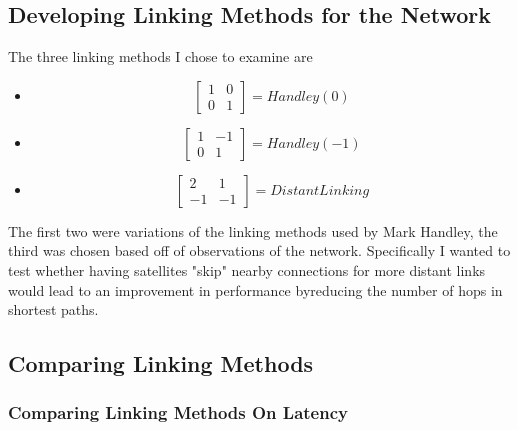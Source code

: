 \documentclass[12pt]{article}
\begin{document}
\subsection{Developing Linking Methods for the Network}

The three linking methods I chose to examine are

\begin{itemize}
\item
\[\begin{bmatrix} 
1 & 0 \\
0 & 1 
\end{bmatrix} = Handley(0)\]
\item
\[\begin{bmatrix} 
1 & -1 \\
0 & 1 
\end{bmatrix} = Handley(-1)\]
\item
\[\begin{bmatrix} 
2 & 1 \\
-1 & -1 
\end{bmatrix} = DistantLinking\]
\end{itemize}

The first two were variations of the linking methods used by Mark Handley, the third was chosen based off of observations of the network. Specifically I wanted to test whether having satellites "skip" nearby connections for more distant links would lead to an improvement in performance byreducing the number of hops in shortest paths.

\subsection{Comparing Linking Methods}

\subsubsection{Comparing Linking Methods On Latency}

\end{document}
